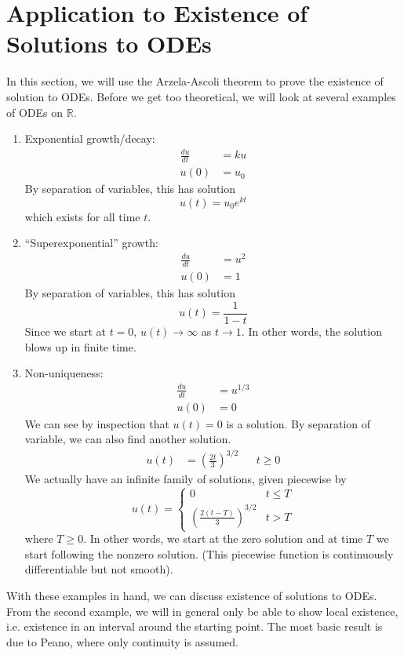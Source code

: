 \documentclass[10pt]{article}         %
\theoremstyle{remark}
\newcommand{\R}{\mathbb{R}}
\begin{document}
\section{Application to Existence of Solutions to ODEs}

In this section, we will use the Arzela-Ascoli theorem to prove the existence of solution to ODEs. Before we get too theoretical, we will look at several examples of ODEs on $\R$.

\begin{enumerate}
\item Exponential growth/decay:
\begin{align*}
\frac{du}{dt} &= k u \\
u(0) &= u_0 
\end{align*}
By separation of variables, this has solution
\[
u(t) = u_0 e^{kt}
\]
which exists for all time $t$.

\item ``Superexponential'' growth:
\begin{align*}
\frac{du}{dt} &= u^2 \\
u(0) &= 1
\end{align*}
By separation of variables, this has solution
\[
u(t) = \frac{1}{1 - t}
\]
Since we start at $t = 0$, $u(t) \rightarrow \infty$ as $t \rightarrow 1$. In other words, the solution blows up in finite time.

\item Non-uniqueness:
\begin{align*}
\frac{du}{dt} &= u^{1/3} \\
u(0) &= 0
\end{align*}
We can see by inspection that $u(t) = 0$ is a solution. By separation of variable, we can also find another solution.
\begin{align*}
u(t) &= \left( \frac{2t}{3} \right)^{3/2} && t \geq 0
\end{align*}
We actually have an infinite family of solutions, given piecewise by
\[
u(t) = \begin{cases}
0 & t \leq T \\
\left( \frac{2(t-T)}{3} \right)^{3/2} & t > T
\end{cases}
\]
where $T \geq 0$. In other words, we start at the zero solution and at time $T$ we start following the nonzero solution. (This piecewise function is continuously differentiable but not smooth).
\end{enumerate}

With these examples in hand, we can discuss existence of solutions to ODEs. From the second example, we will in general only be able to show local existence, i.e. existence in an interval around the starting point. The most basic result is due to Peano, where only continuity is assumed. 
\end{document}
